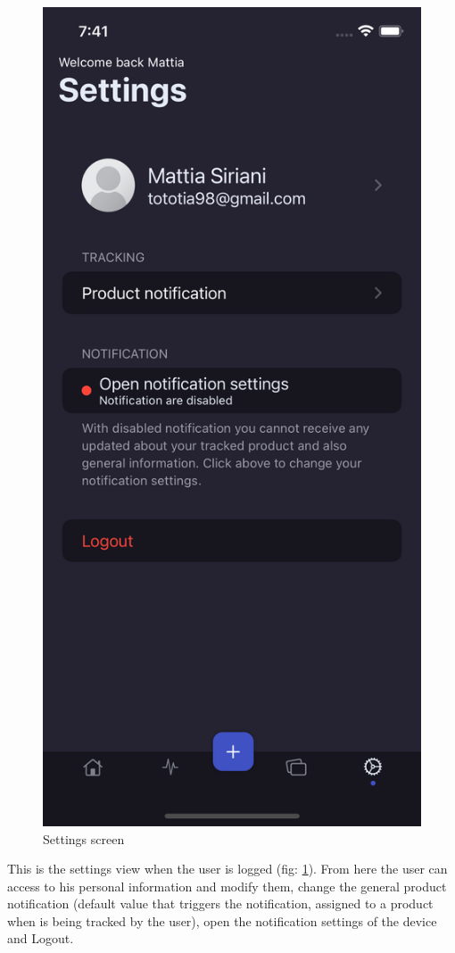 \begin{figure}[h!]
        \centering
        \includegraphics[scale=0.15]{images/interfaces/settings_screen.png}
        \caption{Settings screen}
        \label{fig:settings_screen}
\end{figure}
\FloatBarrier
This is the settings view when the user is logged (fig: \ref{fig:settings_screen}). From here the user can access to his personal information and modify them, change the general product notification (default value that triggers the notification, assigned to a product when is being tracked by the user), open the notification settings of the device and Logout.

